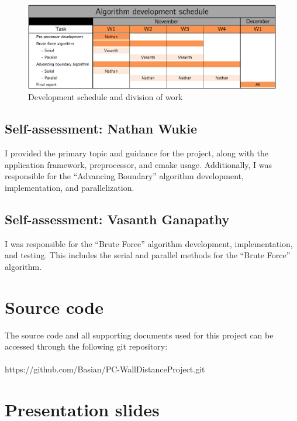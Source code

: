 \documentclass[]{aiaa-tc}%
\begin{document}
\begin{figure}
  \centering
  \includegraphics[width=0.9\linewidth]{figures/schedule_update}
  \caption{Development schedule and division of work}
  \label{f:schedule}
\end{figure}


\subsection{Self-assessment: Nathan Wukie}
I provided the primary topic and guidance for the project, along with
the application framework, preprocessor, and cmake
usage. Additionally, I was responsible for the ``Advancing Boundary''
algorithm development, implementation, and parallelization.

\subsection{Self-assessment: Vasanth Ganapathy}
I was responsible for the “Brute Force” algorithm development,
implementation, and testing.  This includes the serial and parallel
methods for the “Brute Force” algorithm.  





\nocite{*}




\clearpage
\begin{appendices}
  \section{Source code}
  \noindent
  The source code and all supporting documents used for this project
  can be accessed through the following git repository:
  \\\\
  \noindent
  https://github.com/Basian/PC-WallDistanceProject.git

  \section{Presentation slides}
  

\end{appendices}
\end{document}
